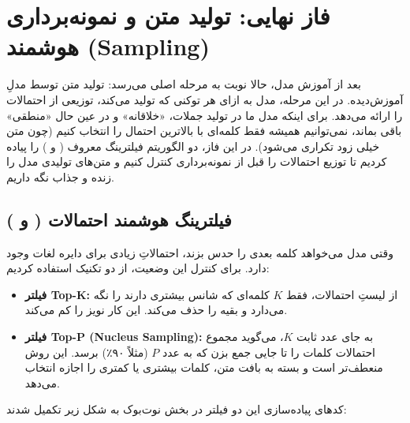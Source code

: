 \documentclass{article}
\begin{document}
\section{فاز نهایی: تولید متن و نمونه‌برداری هوشمند (Sampling)}

\begin{tcolorbox}[
	colback=softgreen,
	colframe=mygreen,
	title=هدف فاز نهایی ( Inference and Sampling ),
	attach boxed title to top right={yshift=-2mm, xshift=-5mm},
	boxed title style={colback=mygreen, rounded corners}
	]
	بعد از آموزش مدل، حالا نوبت به مرحله اصلی می‌رسد: تولید متن توسط مدلِ آموزش‌دیده. در این مرحله، مدل به ازای هر توکنی که تولید می‌کند، توزیعی از احتمالات را ارائه می‌دهد. برای اینکه مدل ما در تولید جملات، «خلاقانه» و در عین حال «منطقی» باقی بماند، نمی‌توانیم همیشه فقط کلمه‌ای با بالاترین احتمال را انتخاب کنیم (چون متن خیلی زود تکراری می‌شود). در این فاز، دو الگوریتم فیلترینگ معروف ( و ) را پیاده کردیم تا توزیع احتمالات را قبل از نمونه‌برداری کنترل کنیم و متن‌های تولیدی مدل را زنده و جذاب نگه داریم.
\end{tcolorbox}

\subsection{فیلترینگ هوشمند احتمالات ( و )}
وقتی مدل می‌خواهد کلمه بعدی را حدس بزند، احتمالاتِ زیادی برای دایره لغات وجود دارد. برای کنترل این وضعیت، از دو تکنیک استفاده کردیم:
\begin{itemize}
	\item \textbf{فیلتر Top-K:} از لیستِ احتمالات، فقط $K$ کلمه‌ای که شانس بیشتری دارند را نگه می‌دارد و بقیه را حذف می‌کند. این کار نویز را کم می‌کند.
	\item \textbf{فیلتر Top-P (Nucleus Sampling):} به جای عدد ثابت $K$، می‌گوید مجموع احتمالات کلمات را تا جایی جمع بزن که به عدد $P$ (مثلاً ۹۰٪) برسد. این روش منعطف‌تر است و بسته به بافت متن، کلمات بیشتری یا کمتری را اجازه انتخاب می‌دهد.
\end{itemize}

کدهای پیاده‌سازی این دو فیلتر در بخش  نوت‌بوک به شکل زیر تکمیل شدند:
\end{document}
